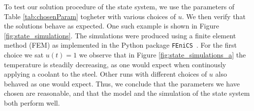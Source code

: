To test our solution procedure of the state system, we use the parameters of Table \ref{tab:chosenParam} togheter with various choices of $u$. We then verify that the solutions behave as expected. One such example is shown in Figure \ref{fig:state_simulations}. The simulations were produced using a finite element method (FEM) as implemented in the Python package \verb|FEniCS|~\cite{fenics}. For the first choice we sat $u(t) = 1$ we observe that in Figure \ref{fig:state_simulations_a} the temperature is steadily decreasing, as one would expect when continously applying a coolant to the steel. Other runs with different choices of $u$ also behaved as one would expect. Thus, we conclude that the parameters we have chosen are reasonable, and that the model and the simulation of the state system both perform well.
\begin{figure}
\end{figure}
